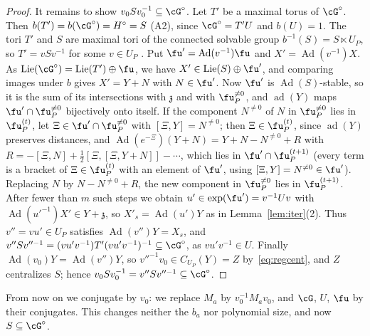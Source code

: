 \begin{proof}
It remains to show $v_0Sv_0^{-1}\subseteq\cG^\circ$. Let $T'$ be a maximal torus of $\cG^\circ$. Then
$b(T')=b(\cG^\circ)=H^\circ=S$ (A2), since $\cG^\circ=T'U$ and $b(U)=1$. The tori $T'$ and $S$ are maximal
tori of the connected solvable group $b^{-1}(S)=S\ltimes U_P$, so $T'=vSv^{-1}$ for some $v\in U_P$
\cite[10.6]{Bor91}. Put $\fu'=\operatorname{Ad}(v^{-1})\fu$ and $X'=\operatorname{Ad}(v^{-1})X$. As
$\operatorname{Lie}(\cG^\circ)=\operatorname{Lie}(T')\oplus\fu$, we have $X'\in\operatorname{Lie}(S)\oplus\fu'$, and comparing images under $b$
gives $X'=Y+N$ with $N\in\fu'$. Now $\fu'$ is $\operatorname{Ad}(S)$-stable, so it is the sum of its intersections
with $\mathfrak z$ and with $\fu_P^{\ne0}$, and $\operatorname{ad}(Y)$ maps $\fu'\cap\fu_P^{\ne0}$ bijectively onto itself.
If the component $N^{\ne0}$ of $N$ in $\fu_P^{\ne0}$ lies in $\fu_P^{(t)}$, let $\Xi\in\fu'\cap\fu_P^{\ne0}$
with $[\Xi,Y]=N^{\ne0}$; then $\Xi\in\fu_P^{(t)}$, since $\operatorname{ad}(Y)$ preserves distances, and
$\operatorname{Ad}(e^{-\Xi})(Y+N)=Y+N-N^{\ne0}+R$ with $R=-[\Xi,N]+\frac12[\Xi,[\Xi,Y+N]]-\cdots$, which lies in
$\fu'\cap\fu_P^{(t+1)}$ (every term is a bracket of $\Xi\in\fu_P^{(t)}$ with an element of $\fu'$, using
$[\Xi,Y]=N^{\ne0}\in\fu'$). Replacing $N$ by $N-N^{\ne0}+R$, the new component in $\fu_P^{\ne0}$ lies in
$\fu_P^{(t+1)}$. After fewer than $m$ such steps we obtain $u'\in\exp(\fu')=v^{-1}Uv$ with
$\operatorname{Ad}(u'^{-1})X'\in Y+\mathfrak z$, so $X'_s=\operatorname{Ad}(u')Y$ as in Lemma~\ref{lem:iter}(2). Thus
$v''=vu'\in U_P$ satisfies $\operatorname{Ad}(v'')Y=X_s$, and
$v''Sv''^{-1}=(vu'v^{-1})T'(vu'v^{-1})^{-1}\subseteq\cG^\circ$, as $vu'v^{-1}\in U$. Finally
$\operatorname{Ad}(v_0)Y=\operatorname{Ad}(v'')Y$, so $v''^{-1}v_0\in C_{U_P}(Y)=Z$ by~\eqref{eq:regcent}, and $Z$ centralizes $S$;
hence $v_0Sv_0^{-1}=v''Sv''^{-1}\subseteq\cG^\circ$.
\end{proof}

From now on we conjugate by $v_0$: we replace $M_a$ by $v_0^{-1}M_av_0$, and $\cG$, $U$, $\fu$ by their
conjugates. This changes neither the $b_a$ nor polynomial size, and now $S\subseteq\cG^\circ$.

